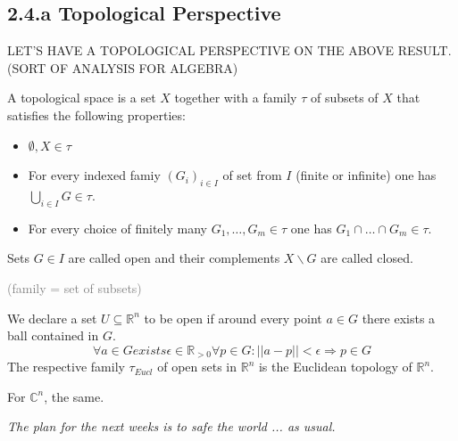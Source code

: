 \subsection*{2.4.a Topological Perspective}
\begin{center}
  \textcolor{airforceblue}{LET'S HAVE A TOPOLOGICAL PERSPECTIVE ON THE ABOVE RESULT.} \\
  \textcolor{airforceblue}{(SORT OF ANALYSIS FOR ALGEBRA) }
\end{center} 

\begin{definition}[title = Definition 2.4.10]
    A topological space is a set $X$ together with a family $\tau$ of subsets of $X$ that satisfies the following properties: 
    \begin{itemize}
      \item[(a)] $\emptyset, X \in \tau$ 
      \item[(b)] For every indexed famiy $(G_i)_{i  \in I}$ of set from $I$ (finite or infinite) one has $\bigcup_{i \in I} G \in \tau$. 
      \item[(c)] For every choice of finitely many $G_1, \ldots, G_m \in \tau$ one has $G_1 \cap \ldots \cap G_m \in \tau$.
    \end{itemize}
    Sets $G \in I$ are called open and their complements $X \backslash G$ are called closed. \\

    \begin{flushright} 
      \footnotesize
      \textcolor{gray}{(family = set of subsets)}
      \normalsize
    \end{flushright}
\end{definition} 

\begin{example}[title = Example 2.4.11 (Euclidean Topology on $\mathbb{R}^n$ and $\mathbb{C}^n$)]
    We declare a set $U \subseteq \mathbb{R}^n$ to be open if around every  point $a \in G$ there exists a ball contained in $G$. 
    \[\forall a \in G exists \epsilon \in \mathbb{R}_{> 0} \forall p \in G: ||a -p|| < \epsilon \Rightarrow p \in G\]
    The respective family $\tau_{Eucl}$ of open sets in $\mathbb{R}^n$ is the Euclidean topology of $\mathbb{R}^n$. 

    For $\mathbb{C}^n$, the same.
\end{example}

\hspace*{0.5cm}\textit{\textcolor{airforceblue}{The plan for the next weeks is to safe the world ... as usual.}}
